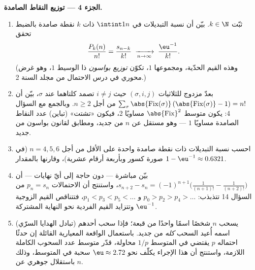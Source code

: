 \begin{problem}
\medskip
\noindent\textbf{الجزء 4 --- توزيع النقاط الصامدة.}
\begin{enumerate}[resume]
  \item ثبّت $k \in \N$. بيّن أن نسبة التبديلات
        في $\intint1n$ ذات $k$ نقطة صامدة بالضبط تحقق
        \[
        \frac{P_k(n)}{n!} = \frac{s_{n-k}}{k!}
        \;\xrightarrow[n \to \infty]{}\; \frac{\eu^{-1}}{k!} .
        \]
        (وهذه القيم الحدّية، ومجموعها $1$، تكوّن
        \emph{توزيع بواسون} ذا الوسيط $1$، وهو غرض محوري
        في درس الاحتمال من مجلد السنة 2.)
  \item بعدّ مزدوج للثلاثيات $(\sigma, i, j)$ حيث $i
        \neq j$ تصمد كلتاهما عند $\sigma$، بيّن أن
        $\sum_\sigma \abs{\mathrm{Fix}(\sigma)}\,
        (\abs{\mathrm{Fix}(\sigma)} - 1) = n!$ من أجل $n \geq 2$.
        وبالجمع مع السؤال 4: يكون متوسط
        $\abs{\mathrm{Fix}}^2$ مساويًا $2$، فيكون «تشتت» (تباين)
        عدد النقاط الصامدة مساويًا $1$ --- وهو مستقل عن $n$ من
        جديد، ومطابق لقانون بواسون من جديد.
  \item احسب نسبة التبديلات ذات نقطة صامدة واحدة على الأقل من
        أجل $n = 4, 5, 6$ (في صورة كسور وبأربعة أرقام عشرية)،
        وقارنها بالمقدار $1 - \eu^{-1} \approx
        0.6321$.
  \item بيّن مباشرة --- دون حاجة إلى أيّ نهايات --- أن $s_{n+2} - s_n
        = (-1)^{n+1}\bigl(\frac1{(n+1)!} - \frac1{(n+2)!}\bigr)$،
        واستنتج أن الاحتمالات $p_n = s_n$ من
        السؤال 14 تتذبذب: $p_0 > p_2 > p_4 > \dots$ و
        $p_1 < p_3 < p_5 < \dots$، فتتناقص القيم الزوجية
        وتتزايد القيم الفردية نحو النهاية المشتركة
        $\eu^{-1}$.
  \item (تبادل الهدايا السرّي) يسحب $n$ شخصًا اسمًا واحدًا من
        قبعة؛ فإذا سحب أحدهم اسمه أُعيد السحب \emph{كله} من
        جديد. باستعمال الواقعة المعيارية القائلة إن حدثًا
        احتماله $p$ يقتضي في المتوسط $1/p$ محاولة، قدّر متوسط
        عدد السحوب الكاملة اللازمة، واستنتج أن هذا الإجراء
        يكلّف نحو $\eu \approx
        2.72$ سحبة في المتوسط، وذلك باستقلال
        جوهري عن $n$.
\end{enumerate}


\end{problem}

